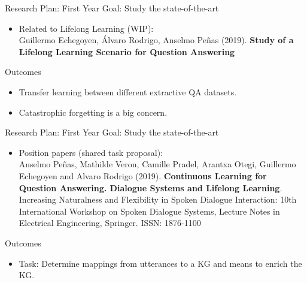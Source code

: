 \documentclass{beamer}
\begin{document}
\begin{frame}{Research Plan: First Year}
  \alert{Goal}: Study the state-of-the-art
  \vspace{0.2cm}
  \begin{itemize}
    \item Related to Lifelong Learning (WIP): \\
      {\small Guillermo Echegoyen, Álvaro Rodrigo, Anselmo Peñas (2019). \textbf{Study of a Lifelong Learning Scenario for Question Answering}}
  \end{itemize}
  \begin{block}{Outcomes}
    \begin{itemize}
      \item Transfer learning between different extractive QA datasets.
      \item Catastrophic forgetting is a big concern.
    \end{itemize}
  \end{block}
\end{frame}

\begin{frame}{Research Plan: First Year}
  \vspace{-0.1cm}
  \alert{Goal}: Study the state-of-the-art
  \vspace{0.1cm}
  \begin{itemize}
    \item Position papers (shared task proposal): \\
      {\small Anselmo Peñas, Mathilde Veron, Camille Pradel, Arantxa Otegi, Guillermo Echegoyen and Alvaro Rodrigo (2019). \textbf{Continuous Learning for Question Answering. Dialogue Systems and Lifelong Learning}. Increasing Naturalness and Flexibility in Spoken Dialogue Interaction: 10th International Workshop on Spoken Dialogue Systems, Lecture Notes in Electrical Engineering, Springer. ISSN: 1876-1100 \cite{penas2019continuous}}
  \end{itemize}
  \begin{block}{Outcomes}
    \begin{itemize}
      \item Task: Determine mappings from utterances to a KG and means to enrich the KG.
    \end{itemize}
  \end{block}
\end{frame}
\end{document}
